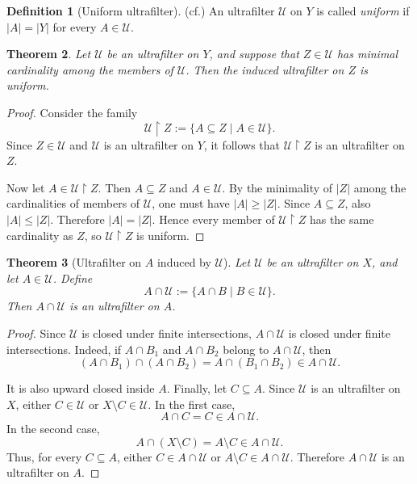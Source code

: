 \documentclass[10pt]{book}
\newtheorem{theorem}{Theorem}[section]
\theoremstyle{definition}
\newtheorem{definition}[theorem]{Definition}
\begin{document}
\begin{definition}[Uniform ultrafilter] (cf.\cite{negrepontis1969existence})
An ultrafilter \(\mathcal{U}\) on \(Y\) is called \emph{uniform} if \(|A|=|Y|\) for every \(A\in\mathcal{U}\).
\end{definition}

\begin{theorem}
Let \(\mathcal{U}\) be an ultrafilter on \(Y\), and suppose that \(Z\in\mathcal{U}\) has minimal cardinality among the members of \(\mathcal{U}\).  
Then the induced ultrafilter on \(Z\) is uniform.
\end{theorem}

\begin{proof}
Consider the family
\[
\mathcal{U}\!\upharpoonright Z:=\{A\subseteq Z \mid A\in\mathcal{U}\}.
\]
Since \(Z\in\mathcal{U}\) and \(\mathcal{U}\) is an ultrafilter on \(Y\), it follows that \(\mathcal{U}\!\upharpoonright Z\) is an ultrafilter on \(Z\).

Now let \(A\in \mathcal{U}\!\upharpoonright Z\).  
Then \(A\subseteq Z\) and \(A\in\mathcal{U}\).  
By the minimality of \(|Z|\) among the cardinalities of members of \(\mathcal{U}\), one must have \(|A|\geq |Z|\).  
Since \(A\subseteq Z\), also \(|A|\leq |Z|\).  
Therefore \(|A|=|Z|\).  
Hence every member of \(\mathcal{U}\!\upharpoonright Z\) has the same cardinality as \(Z\), so \(\mathcal{U}\!\upharpoonright Z\) is uniform.
\end{proof}

\begin{theorem}[Ultrafilter on \(A\) induced by \(\mathcal{U}\)]
Let \(\mathcal{U}\) be an ultrafilter on \(X\), and let \(A\in\mathcal{U}\).  
Define
\[
A\cap \mathcal{U}:=\{A\cap B \mid B\in\mathcal{U}\}.
\]
Then \(A\cap \mathcal{U}\) is an ultrafilter on \(A\).
\end{theorem}

\begin{proof}
Since \(\mathcal{U}\) is closed under finite intersections, \(A\cap \mathcal{U}\) is closed under finite intersections.  
Indeed, if \(A\cap B_1\) and \(A\cap B_2\) belong to \(A\cap\mathcal{U}\), then
\[
(A\cap B_1)\cap (A\cap B_2)=A\cap (B_1\cap B_2)\in A\cap\mathcal{U}.
\]

It is also upward closed inside \(A\).  
Finally, let \(C\subseteq A\).  
Since \(\mathcal{U}\) is an ultrafilter on \(X\), either \(C\in\mathcal{U}\) or \(X\setminus C\in\mathcal{U}\).  
In the first case,
\[
A\cap C=C\in A\cap\mathcal{U}.
\]
In the second case,
\[
A\cap (X\setminus C)=A\setminus C\in A\cap\mathcal{U}.
\]
Thus, for every \(C\subseteq A\), either \(C\in A\cap\mathcal{U}\) or \(A\setminus C\in A\cap\mathcal{U}\).  
Therefore \(A\cap\mathcal{U}\) is an ultrafilter on \(A\).
\end{proof}
\end{document}
